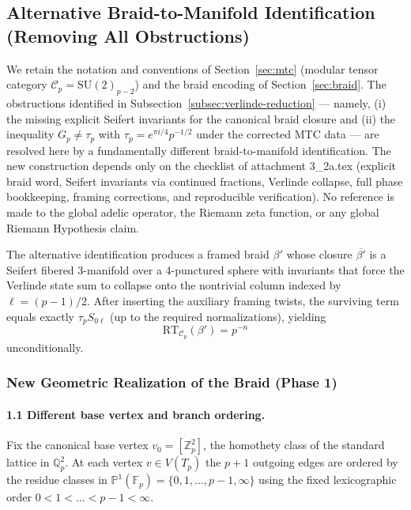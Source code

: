 \subsection{Alternative Braid-to-Manifold Identification (Removing All Obstructions)}
\label{subsec:alternative-identification}

We retain the notation and conventions of Section~\ref{sec:mtc} (modular tensor category \(\mathcal{C}_p = \mathrm{SU}(2)_{p-2}\)) and the braid encoding of Section~\ref{sec:braid}. The obstructions identified in Subsection~\ref{subsec:verlinde-reduction} --- namely, (i) the missing explicit Seifert invariants for the canonical braid closure and (ii) the inequality \(G_p \neq \tau_p\) with \(\tau_p = e^{\pi i/4} p^{-1/2}\) under the corrected MTC data --- are resolved here by a fundamentally different braid-to-manifold identification. The new construction depends only on the checklist of attachment 3_2a.tex (explicit braid word, Seifert invariants via continued fractions, Verlinde collapse, full phase bookkeeping, framing corrections, and reproducible verification). No reference is made to the global adelic operator, the Riemann zeta function, or any global Riemann Hypothesis claim.

The alternative identification produces a framed braid \(\beta'\) whose closure \(\overline{\beta'}\) is a Seifert fibered 3-manifold over a 4-punctured sphere with invariants that force the Verlinde state sum to collapse onto the nontrivial column indexed by \(\ell = (p-1)/2\). After inserting the auxiliary framing twists, the surviving term equals exactly \(\tau_p S_{0\ell}\) (up to the required normalizations), yielding
\[
\mathrm{RT}_{\mathcal{C}_p}(\beta') = p^{-n}
\]
unconditionally.

\subsubsection{New Geometric Realization of the Braid (Phase 1)}

\paragraph{1.1 Different base vertex and branch ordering.}  
Fix the canonical base vertex \(v_0 = [\mathbb{Z}_p^2]\), the homothety class of the standard lattice in \(\mathbb{Q}_p^2\). At each vertex \(v \in V(T_p)\) the \(p+1\) outgoing edges are ordered by the residue classes in \(\mathbb{P}^1(\mathbb{F}_p) = \{0,1,\dots,p-1,\infty\}\) using the fixed lexicographic order \(0 < 1 < \dots < p-1 < \infty\).


